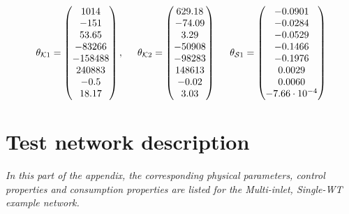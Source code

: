  \begin{equation}
\label{par_matrices_output_example123}
         \theta_{\mathcal{K}1} = 
          \begin{pmatrix}
           1014  \\
           -151  \\
           53.65  \\
           -83266  \\
           -158488  \\
           240883 \\
           -0.5 \\
           18.17 \\
         \end{pmatrix}
         ,
         \hspace{5mm}
         \theta_{\mathcal{K}2} = 
          \begin{pmatrix}
           629.18  \\
           -74.09  \\
           3.29  \\
           -50908  \\
           -98283  \\
           148613 \\
           -0.02 \\
           3.03 \\
         \end{pmatrix}
\hspace{5mm}
         \theta_{\mathcal{S}1} = 
          \begin{pmatrix}
           -0.0901 \\
            -0.0284 \\
             -0.0529 \\
              -0.1466 \\
               -0.1976 \\
                0.0029 \\
                  0.0060 \\
                   -7.66 \cdot 10^{-4} 

         \end{pmatrix}
\end{equation}

\chapter{Test network description}
\label{physical_properties_example1}

\emph{In this part of the appendix, the corresponding physical parameters, control properties and consumption properties are listed for the Multi-inlet, Single-WT example network.}

